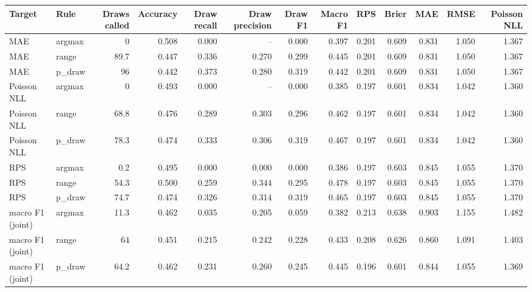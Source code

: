 
\begin{tabular}{llrrrrrrrrrrr}
\toprule
Target & Rule & Draws called & Accuracy & Draw recall & Draw precision & Draw F1 & Macro F1 & RPS & Brier & MAE & RMSE & Poisson NLL\\
\midrule
MAE & argmax & 0 & 0.508 & 0.000 & -- & 0.000 & 0.397 & 0.201 & 0.609 & 0.831 & 1.050 & 1.367\\
MAE & range & 89.7 & 0.447 & 0.336 & 0.270 & 0.299 & 0.445 & 0.201 & 0.609 & 0.831 & 1.050 & 1.367\\
MAE & p\_draw & 96 & 0.442 & 0.373 & 0.280 & 0.319 & 0.442 & 0.201 & 0.609 & 0.831 & 1.050 & 1.367\\
Poisson NLL & argmax & 0 & 0.493 & 0.000 & -- & 0.000 & 0.385 & 0.197 & 0.601 & 0.834 & 1.042 & 1.360\\
Poisson NLL & range & 68.8 & 0.476 & 0.289 & 0.303 & 0.296 & 0.462 & 0.197 & 0.601 & 0.834 & 1.042 & 1.360\\
Poisson NLL & p\_draw & 78.3 & 0.474 & 0.333 & 0.306 & 0.319 & 0.467 & 0.197 & 0.601 & 0.834 & 1.042 & 1.360\\
RPS & argmax & 0.2 & 0.495 & 0.000 & 0.000 & 0.000 & 0.386 & 0.197 & 0.603 & 0.845 & 1.055 & 1.370\\
RPS & range & 54.3 & 0.500 & 0.259 & 0.344 & 0.295 & 0.478 & 0.197 & 0.603 & 0.845 & 1.055 & 1.370\\
RPS & p\_draw & 74.7 & 0.474 & 0.326 & 0.314 & 0.319 & 0.465 & 0.197 & 0.603 & 0.845 & 1.055 & 1.370\\
macro F1 (joint) & argmax & 11.3 & 0.462 & 0.035 & 0.205 & 0.059 & 0.382 & 0.213 & 0.638 & 0.903 & 1.155 & 1.482\\
macro F1 (joint) & range & 64 & 0.451 & 0.215 & 0.242 & 0.228 & 0.433 & 0.208 & 0.626 & 0.860 & 1.091 & 1.403\\
macro F1 (joint) & p\_draw & 64.2 & 0.462 & 0.231 & 0.260 & 0.245 & 0.445 & 0.196 & 0.601 & 0.844 & 1.055 & 1.369\\
\bottomrule
\end{tabular}
